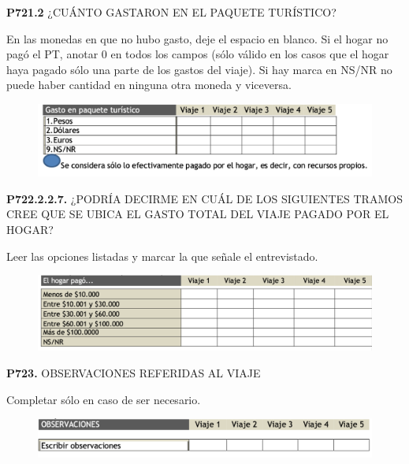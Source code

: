 \documentclass[
  openany]{book}
\begin{document}
\textbf{P721.2} ¿CUÁNTO GASTARON EN EL PAQUETE TURÍSTICO?

En las monedas en que no hubo gasto, deje el espacio en blanco. Si el hogar no pagó el PT, anotar 0 en todos los campos (sólo válido en los casos que el hogar haya pagado sólo una parte de los gastos del viaje). Si hay marca en NS/NR no puede haber cantidad en ninguna otra moneda y viceversa.

\begin{figure}

{\centering \includegraphics[width=1\linewidth]{imagenes/figura6-250} 

}

\end{figure}

\textbf{P722.2.2.7.} ¿PODRÍA DECIRME EN CUÁL DE LOS SIGUIENTES TRAMOS CREE QUE SE UBICA EL GASTO TOTAL DEL VIAJE PAGADO POR EL HOGAR?

Leer las opciones listadas y marcar la que señale el entrevistado.

\begin{figure}

{\centering \includegraphics[width=1\linewidth]{imagenes/figura6-251} 

}

\end{figure}

\textbf{P723.} OBSERVACIONES REFERIDAS AL VIAJE

Completar sólo en caso de ser necesario.

\begin{figure}

{\centering \includegraphics[width=1\linewidth]{imagenes/figura6-252} 

}

\end{figure}
\end{document}
